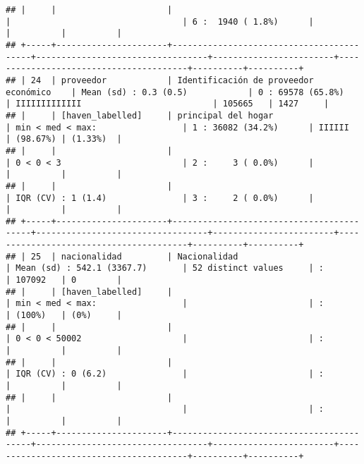 \documentclass[]{article}
\begin{document}
\begin{verbatim}
## |     |                      |                                          |                                  | 6 :  1940 ( 1.8%)      |                                        |          |          |
## +-----+----------------------+------------------------------------------+----------------------------------+------------------------+----------------------------------------+----------+----------+
## | 24  | proveedor            | Identificación de proveedor económico    | Mean (sd) : 0.3 (0.5)            | 0 : 69578 (65.8%)      | IIIIIIIIIIIII                          | 105665   | 1427     |
## |     | [haven_labelled]     | principal del hogar                      | min < med < max:                 | 1 : 36082 (34.2%)      | IIIIII                                 | (98.67%) | (1.33%)  |
## |     |                      |                                          | 0 < 0 < 3                        | 2 :     3 ( 0.0%)      |                                        |          |          |
## |     |                      |                                          | IQR (CV) : 1 (1.4)               | 3 :     2 ( 0.0%)      |                                        |          |          |
## +-----+----------------------+------------------------------------------+----------------------------------+------------------------+----------------------------------------+----------+----------+
## | 25  | nacionalidad         | Nacionalidad                             | Mean (sd) : 542.1 (3367.7)       | 52 distinct values     | :                                      | 107092   | 0        |
## |     | [haven_labelled]     |                                          | min < med < max:                 |                        | :                                      | (100%)   | (0%)     |
## |     |                      |                                          | 0 < 0 < 50002                    |                        | :                                      |          |          |
## |     |                      |                                          | IQR (CV) : 0 (6.2)               |                        | :                                      |          |          |
## |     |                      |                                          |                                  |                        | :                                      |          |          |
## +-----+----------------------+------------------------------------------+----------------------------------+------------------------+----------------------------------------+----------+----------+

\end{verbatim}
\end{document}
